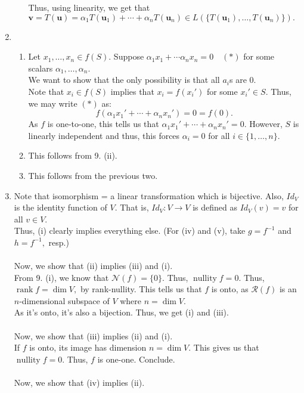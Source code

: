 \documentclass{article}
\newcommand{\rank}{\operatorname{rank}}
\newcommand{\nullity}{\operatorname{nullity}}
\begin{document}
\begin{enumerate}
\begin{enumerate}[label=(\roman*)]
		Thus, using linearity, we get that $\mathbf{v} = T(\mathbf{u}) = \alpha_1T(\mathbf{u}_1) + \cdots + \alpha_nT(\mathbf{u}_n) \in L\left(\{T(\mathbf{u}_1), \ldots, T(\mathbf{u}_n)\}\right).$
	\end{enumerate}
	\item 
	\begin{enumerate} 
		\item Let $x_1, \ldots, x_n \in f(S).$ Suppose $\alpha_1x_1 + \cdots \alpha_nx_n = 0 \quad (*)$ for some scalars $\alpha_1, \ldots, \alpha_n.$\\
		We want to show that the only possibility is that all $a_i$s are $0.$\\
		Note that $x_i \in f(S)$ implies that $x_i = f(x_i')$ for some $x_i' \in S.$ Thus, we may write $(*)$ as:
		\[f(\alpha_1x_1' + \cdots + \alpha_nx_n') = 0 = f(0).\]
		As $f$ is one-to-one, this tells us that $\alpha_1x_1' + \cdots + \alpha_nx_n' = 0.$ However, $S$ is linearly independent and thus, this forces $\alpha_i = 0$ for all $i \in \{1, \ldots, n\}.$
		\item This follows from 9. (ii).
		\item This follows from the previous two.
	\end{enumerate}
	\item Note that isomorphism = a linear transformation which is bijective. Also, $Id_V$ is the identity function of $V.$ That is, $Id_V : V \to V$ is defined as $Id_V(v) = v$ for all $v \in V.$\\
	Thus, (i) clearly implies everything else. (For (iv) and (v), take $g = f^{-1}$ and $h = f^{-1},$ resp.)\\~\\
	Now, we show that (ii) implies (iii) and (i).\\
	From 9. (i), we know that $\mathcal{N}(f) = \{0\}.$ Thus, $\nullity f = 0.$ Thus, $\rank f = \dim V,$ by rank-nullity. This tells us that $f$ is onto, as $\mathcal{R}(f)$ is an $n$-dimensional subspace of $V$ where $n = \dim V.$\\
	As it's onto, it's also a bijection. Thus, we get (i) and (iii).\\~\\
	Now, we show that (iii) implies (ii) and (i).\\
	If $f$ is onto, its image has dimension $n = \dim V$. This gives us that $\nullity f = 0.$ Thus, $f$ is one-one. Conclude.\\~\\
	Now, we show that (iv) implies (ii).\\

\end{enumerate}
\end{document}
